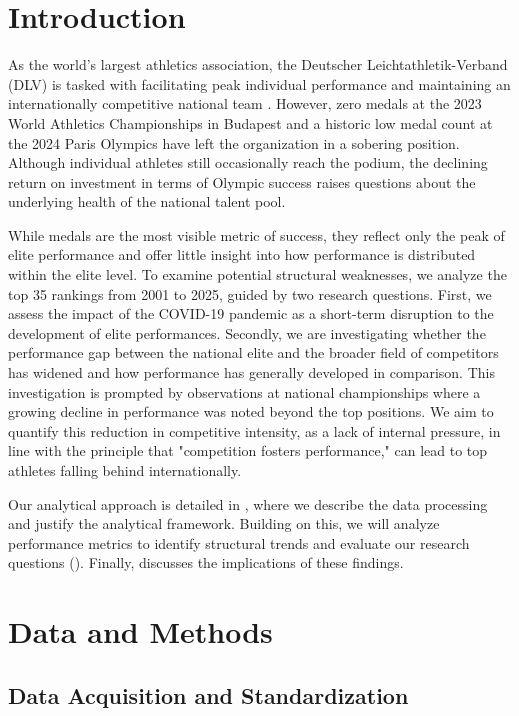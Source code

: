 \section{Introduction}\label{sec:intro}

As the world’s largest athletics association, the Deutscher Leichtathletik-Verband (DLV) is tasked with facilitating peak individual performance and maintaining an internationally 
competitive national team \citep{DLV2026}. However, zero medals at the 2023 World Athletics Championships in Budapest and a historic low medal count at the 2024 Paris Olympics have 
left the organization in a sobering position. Although individual athletes still occasionally reach the podium, the declining return on investment in terms of Olympic success \citep{fremerey2024} 
raises questions about the underlying health of the national talent pool.

While medals are the most visible metric of success, they reflect only the peak of elite performance and offer little insight into how performance is distributed within the elite level. 
To examine potential structural weaknesses, we analyze the top 35 rankings from 2001 to 2025, guided by two research questions. First, we assess the impact of the COVID-19 pandemic as a 
short-term disruption to the development of elite performances. 
Secondly, we are investigating whether the performance gap between the national elite and the broader field of competitors has widened and how performance has generally developed in comparison. 
This investigation is prompted by observations at national championships where a growing decline in performance was noted beyond the top positions. 
We aim to quantify this reduction in competitive intensity, as a lack of internal pressure, in line with the principle that "competition fosters performance," can lead to top athletes falling behind internationally.

Our analytical approach is detailed in , where we describe the data processing and justify the analytical framework. Building on this, we will analyze performance metrics 
to identify structural trends and evaluate our research questions (). Finally,  discusses the implications of these findings.

\section{Data and Methods}\label{sec:methods}
\subsection{Data Acquisition and Standardization}           
 
